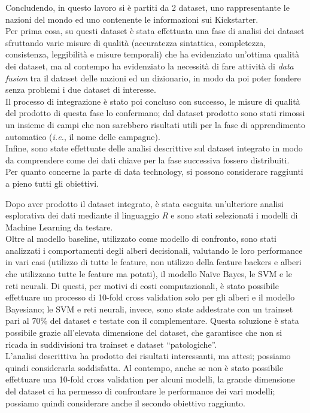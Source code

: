 Concludendo, in questo lavoro si è partiti da 2 dataset, uno rappresentante le nazioni del mondo ed uno contenente le informazioni sui Kickstarter.\\
Per prima cosa, su questi dataset è stata effettuata una fase di analisi dei dataset sfruttando varie misure di qualità (accuratezza sintattica, completezza, consistenza, leggibilità e misure temporali) che ha evidenziato un'ottima qualità dei dataset, ma al contempo ha evidenziato la necessità di fare attività di \textit{data fusion} tra il dataset delle nazioni ed un dizionario, in modo da poi poter fondere senza problemi i due dataset di interesse.\\
Il processo di integrazione è stato poi concluso con successo, le misure di qualità del prodotto di questa fase lo confermano; dal dataset prodotto sono stati rimossi un insieme di campi che non sarebbero risultati utili per la fase di apprendimento automatico (\textit{i.e.}, il nome delle campagne).\\
Infine, sono state effettuate delle analisi descrittive sul dataset integrato in modo da comprendere come dei dati chiave per la fase successiva fossero distribuiti.\\
Per quanto concerne la parte di data technology, si possono considerare raggiunti a pieno tutti gli obiettivi.

Dopo aver prodotto il dataset integrato, è stata eseguita un'ulteriore analisi esplorativa dei dati mediante il linguaggio \emph{R} e sono stati selezionati i modelli di Machine Learning da testare.\\
Oltre al modello baseline, utilizzato come modello di confronto, sono stati analizzati i comportamenti degli alberi decisionali, valutando le loro performance in vari casi (utilizzo di tutte le feature, non utilizzo della feature backers e alberi che utilizzano tutte le feature ma potati), il modello Na\"ive Bayes, le SVM e le reti neurali.
Di questi, per motivi di costi computazionali, è stato possibile effettuare un processo di 10-fold cross validation solo per gli alberi e il modello Bayesiano; le SVM e reti neurali, invece, sono state addestrate con un trainset pari al 70\% del dataset e testate con il complementare. Questa soluzione è stata possibile grazie all'elevata dimensione del dataset, che garantisce che non si ricada in suddivisioni tra trainset e dataset “patologiche”.\\
L'analisi descrittiva ha prodotto dei risultati interessanti, ma attesi; possiamo quindi considerarla soddisfatta. Al contempo, anche se non è stato possibile effettuare una 10-fold cross validation per alcuni modelli, la grande dimensione del dataset ci ha permesso di confrontare le performance dei vari modelli; possiamo quindi considerare anche il secondo obiettivo raggiunto.

